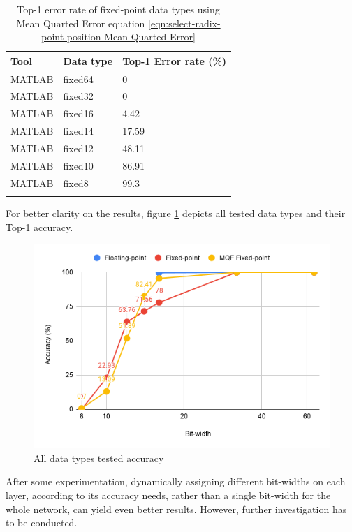 \begin{table}[H]
	\caption{Top-1 error rate of fixed-point data types using Mean Quarted Error equation \ref{eqn:select-radix-point-position-Mean-Quarted-Error}}
	\label{tab:fixed-MQE-error-rates}
	\centering
	\begin{tabular}{lll}
		\toprule
		\textbf{Tool} & \textbf{Data type} & \textbf{Top-1 Error rate (\%)}\\
		\midrule
			MATLAB 	& fixed64	& 0 	\\
			MATLAB 	& fixed32	& 0 	\\
			MATLAB 	& fixed16	& 4.42 	\\
			MATLAB 	& fixed14	& 17.59 \\
			MATLAB 	& fixed12	& 48.11 \\
			MATLAB 	& fixed10	& 86.91	\\
			MATLAB 	& fixed8	& 99.3 	\\
		\bottomrule\\
	\end{tabular}
\end{table}

For better clarity on the results, figure \ref{fig:data-types-accuracy-chart} depicts all tested data types and their Top-1 accuracy.

\begin{figure} [H]
	\centering
	\includegraphics[width=\textwidth]{Images/Weights-distributions/data-types-accuracy-chart.png}
	\decoRule
	\caption[All data types tested accuracy]{All data types tested accuracy}
	\label{fig:data-types-accuracy-chart}
\end{figure}

After some experimentation, dynamically assigning different bit-widths on each layer, according to its accuracy needs, rather than a single bit-width for the whole network, can yield even better results. However, further investigation has to be conducted.

